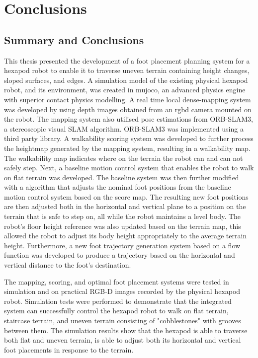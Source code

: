 \chapter{Conclusions}
    \section{Summary and Conclusions}
        This thesis presented the development of a foot placement planning system for a hexapod robot to enable it to traverse uneven terrain containing height changes, sloped surfaces, and edges.
        A simulation model of the existing physical hexapod robot, and its environment, was created in \ac{mujoco}, an advanced physics engine with superior contact physics modelling.
        A real time local dense-mapping system was developed by using depth images obtained from an \ac{rgbd} camera mounted on the robot. The mapping  system also utilised pose estimations from ORB-SLAM3, a stereoscopic visual SLAM algorithm. ORB-SLAM3 was implemented using a third party library.
        A walkability scoring system was developed to further process the heightmap generated by the mapping system, resulting in a walkability map. The walkability map indicates where on the terrain the robot can and can not safely step.
        Next, a baseline motion control system that enables the robot to walk on flat terrain was developed. The baseline system was then further modified with a algorithm that adjusts the nominal foot positions from the baseline motion control system based on the score map. The resulting new foot positions are then adjusted both in the horizontal and vertical plane to a position on the terrain that is safe to step on, all while the robot maintains a level body. The robot's floor height reference was also updated based on the terrain map, this allowed the robot to adjust its body height appropriately to the average terrain height. Furthermore, a new foot trajectory generation system based on a flow function was developed to produce a trajectory based on the horizontal and vertical distance to the foot's destination.

        The mapping, scoring, and optimal foot placement systems were tested in simulation and on practical RGB-D images recorded by the physical hexapod robot. Simulation tests were performed to demonstrate that the integrated system can successfully control the hexapod robot to walk on flat terrain, staircase terrain, and uneven terrain consisting of "cobblestones"  with grooves between them. The simulation results show that the hexapod is able to traverse both flat and uneven terrain, is able to adjust both its horizontal and vertical foot placements in response to the terrain.

